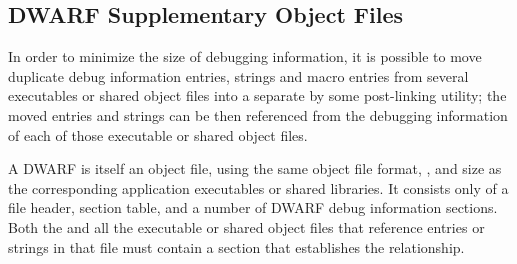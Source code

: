 \subsection{DWARF Supplementary Object Files}
\label{datarep:dwarfsupplemetaryobjectfiles}
In order to minimize the size of debugging information, it is possible
to move duplicate debug information entries, strings and macro entries from
several executables or shared object files into a separate 
 by some
post-linking utility; the moved entries and strings can be then referenced
from the debugging information of each of those executable or shared object files.

A DWARF  is itself an object file, 
using the same object
file format, \byteorder{}, and size as the corresponding application executables
or shared libraries. It consists only of a file header, section table, and
a number of DWARF debug information sections.  Both the 
and all the executable or shared object files that reference entries or strings in that
file must contain a \dotdebugsup{} section that establishes the relationship.

